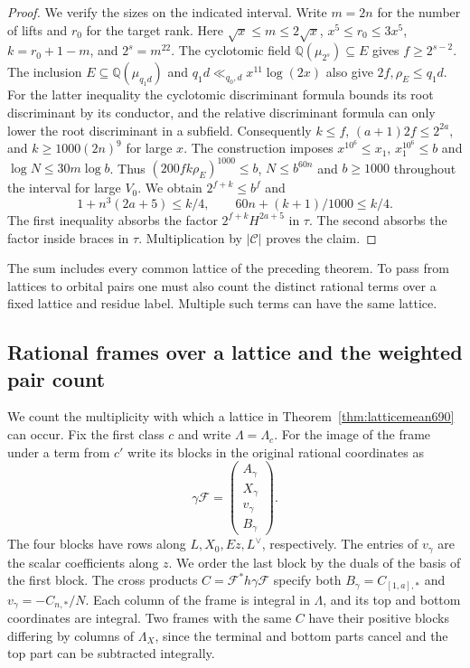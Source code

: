 \documentclass[a4paper,11pt]{article}
\theoremstyle{definition}
\theoremstyle{remark}
\numberwithin{equation}{section}
\begin{document}
\begin{proof}
We verify the sizes on the indicated interval. Write \(m=2n\)
for the number of lifts and \(r_0\) for the target rank.
Here \(\sqrt x\le m\le2\sqrt x\), \(x^5\le r_0\le3x^5\),
\(k=r_0+1-m\), and \(2^s=m^{22}\). The cyclotomic field
\(\mathbb Q(\mu_{2^s})\subseteq E\) gives \(f\ge2^{s-2}\).
The inclusion \(E\subseteq\mathbb Q(\mu_{q_1d})\) and
\(q_1d\ll_{q_0,d}x^{11}\log(2x)\) also give
\(2f,\rho_E\le q_1d\). For the latter inequality the
cyclotomic discriminant formula bounds its root discriminant
by its conductor, and the relative discriminant formula
can only lower the root discriminant in a subfield.
Consequently \(k\le f\), \((a+1)2f\le2^{2a}\), and
\(k\ge1000(2n)^9\) for large \(x\). The construction imposes
\(x^{10^6}\le x_1\), \(x_1^{10^6}\le b\) and
\(\log N\le30m\log b\). Thus
\((200 f k\rho_E)^{1000}\le b\), \(N\le b^{60n}\) and
\(b\ge1000\) throughout the interval for large \(V_0\).
We obtain \(2^{f+k}\le b^f\) and
\[
 1+n^3(2a+5)\le k/4,\qquad
 60n+(k+1)/1000\le k/4 .
\]
The first inequality absorbs the factor \(2^{f+k}H^{2a+5}\)
in \(\tau\). The second absorbs the factor inside braces in
\(\tau\). Multiplication by \(|\mathcal C|\) proves the claim.
\end{proof}

The sum includes every common lattice of the preceding theorem.
To pass from lattices to orbital pairs one must also count
the distinct rational terms over a fixed lattice and residue
label. Multiple such terms can have the same lattice.


\subsection{Rational frames over a lattice and the weighted pair count}
\label{sec:framepairs691}

We count the multiplicity with which a lattice in
Theorem~\ref{thm:latticemean690} can occur. Fix the first class
\(c\) and write \(\Lambda=\Lambda_c\). For the image of the
frame under a term from \(c'\) write its blocks in the original
rational coordinates as
\[
             \gamma\mathcal F=
               \begin{pmatrix} A_\gamma\\ X_\gamma\\ v_\gamma\\
                                  B_\gamma\end{pmatrix}.
\]
The four blocks have rows along \(L,X_0,Ez,L^\vee\), respectively. The entries of
\(v_\gamma\) are the scalar coefficients along \(z\). We order
the last block by the duals of the basis of the first block.
The cross products \(C=\mathcal F^*h\gamma\mathcal F\) specify
both \(B_\gamma=C_{[1,a],*}\) and \(v_\gamma=-C_{n,*}/N\).
Each column of the frame is integral in \(\Lambda\), and its
top and bottom coordinates are integral. Two frames with the
same \(C\) have their positive blocks differing by columns
of \(\Lambda_X\), since the terminal and bottom parts cancel
and the top part can be subtracted integrally.
\end{document}

